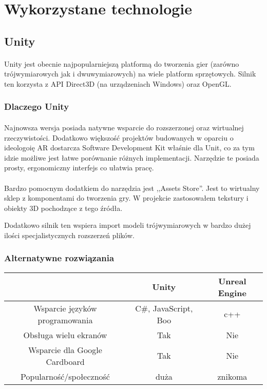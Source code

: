 \newpage
\section{Wykorzystane technologie}

\subsection{Unity}
\paragraph{}
Unity jest obecnie najpopularniejszą platformą do tworzenia gier (zarówno trójwymiarowych jak i dwuwymiarowych) na wiele platform sprzętowych. Silnik ten korzysta z API Direct3D (na urządzeniach Windows) oraz OpenGL.
\subsubsection{Dlaczego Unity}
\paragraph{}
Najnowsza wersja posiada natywne wsparcie do rozszerzonej oraz wirtualnej rzeczywistości. Dodatkowo większość projektów budowanych w oparciu o ideologoię AR dostarcza Software Development Kit właśnie dla Unit, co za tym idzie możliwe jest łatwe porównanie różnych implementacji.
Narzędzie te posiada prosty, ergonomiczny interfejs co ułatwia pracę.
\paragraph{}
Bardzo pomocnym dodatkiem do narzędzia jest ,,Assets Store''. Jest to wirtualny sklep z komponentami do tworzenia gry. W projekcie zastosowałem tekstury i obiekty 3D pochodzące z tego źródła.

Dodatkowo silnik ten wspiera import modeli trójwymiarowych w bardzo dużej ilości specjalistycznych rozszerzeń plików.

\subsubsection{Alternatywne rozwiązania}
 \begin{tabular}{|c|c|c|}
 \hline
 \ & Unity & Unreal Engine \\ 
  \hline
 Wsparcie języków programowania & C\#, JavaScript, Boo & c++ \\  
  \hline
 Obsługa wielu ekranów & Tak & Nie \\
 \hline  
  Wsparcie dla Google Cardboard & Tak & Nie \\
  \hline   
  Popularność/społeczność & duża &  znikoma \\
  \hline   
\end{tabular}

